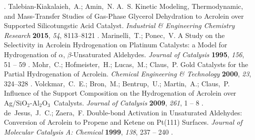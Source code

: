 \documentclass[journal=iecred,manuscript=article]{achemso}
\begin{document}
{\begin{mcitethebibliography}
\mciteBstWouldAddEndPuncttrue
\mciteSetBstMidEndSepPunct{\mcitedefaultmidpunct}
{\mcitedefaultendpunct}{\mcitedefaultseppunct}\relax
\unskip.
Talebian-Kiakalaieh,~A.; Amin,~N. A.~S. Kinetic Modeling, Thermodynamic, and
  Mass-Transfer Studies of Gas-Phase Glycerol Dehydration to Acrolein over
  Supported Silicotungstic Acid Catalyst. \emph{Industrial \& Engineering
  Chemistry Research} \textbf{2015}, \emph{54}, 8113--8121\relax
\mciteBstWouldAddEndPuncttrue
\mciteSetBstMidEndSepPunct{\mcitedefaultmidpunct}
{\mcitedefaultendpunct}{\mcitedefaultseppunct}\relax
\unskip.
Marinelli,~T.; Ponec,~V. A Study on the Selectivity in Acrolein Hydrogenation
  on Platinum Catalysts: a Model for Hydrogenation of $\alpha$,
  $\beta$-Unsaturated Aldehydes. \emph{Journal of Catalysis} \textbf{1995},
  \emph{156}, 51 -- 59\relax
\mciteBstWouldAddEndPuncttrue
\mciteSetBstMidEndSepPunct{\mcitedefaultmidpunct}
{\mcitedefaultendpunct}{\mcitedefaultseppunct}\relax
\unskip.
Mohr,~C.; Hofmeister,~H.; Lucas,~M.; Claus,~P. Gold Catalysts for the Partial
  Hydrogenation of Acrolein. \emph{Chemical Engineering \& Technology}
  \textbf{2000}, \emph{23}, 324--328\relax
\mciteBstWouldAddEndPuncttrue
\mciteSetBstMidEndSepPunct{\mcitedefaultmidpunct}
{\mcitedefaultendpunct}{\mcitedefaultseppunct}\relax
\unskip.
Volckmar,~C.~E.; Bron,~M.; Bentrup,~U.; Martin,~A.; Claus,~P. Influence of the
  Support Composition on the Hydrogenation of Acrolein over
  Ag/SiO$_2$-Al$_2$O$_3$\  Catalysts. \emph{Journal of Catalysis} \textbf{2009},
  \emph{261}, 1 -- 8\relax
\mciteBstWouldAddEndPuncttrue
\mciteSetBstMidEndSepPunct{\mcitedefaultmidpunct}
{\mcitedefaultendpunct}{\mcitedefaultseppunct}\relax
\unskip.
de~Jesus,~J.~C.; Zaera,~F. Double-bond Activation in Unsaturated Aldehydes:
  Conversion of Acrolein to Propene and Ketene on Pt(111) Surfaces.
  \emph{Journal of Molecular Catalysis A: Chemical} \textbf{1999}, \emph{138},
  237 -- 240\relax
\mciteBstWouldAddEndPuncttrue
\mciteSetBstMidEndSepPunct{\mcitedefaultmidpunct}
{\mcitedefaultendpunct}{\mcitedefaultseppunct}\relax
\unskip.

\end{mcitethebibliography}}
\end{document}
